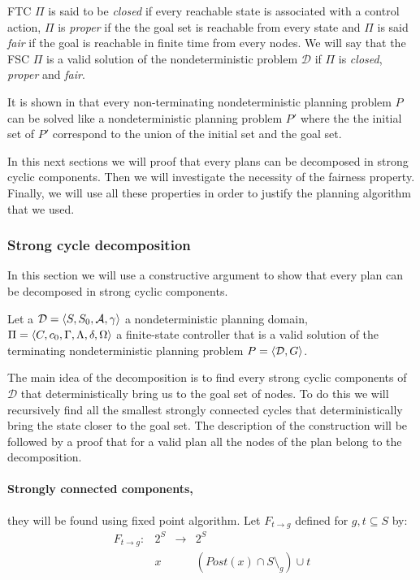 FTC $\Pi$ is said to be \textit{closed} if every reachable state is associated with a control  action, $\Pi$ is \textit{proper} if the the goal set is reachable from every state and $\Pi$ is said \textit{fair} if the goal is reachable in finite time from every nodes.
We will say that the FSC $\Pi$ is a valid solution of the nondeterministic problem $\mathcal{D}$ if $\Pi$ is \textit{closed}, \textit{proper} and \textit{fair}.

It is shown in \cite{patrizi2013fair} that every non-terminating nondeterministic planning problem $P$ can be solved like a nondeterministic planning problem $P'$ where the the initial set of $P'$ correspond to the union of the initial set and the goal set.

In this next sections we will proof that every plans can be decomposed in strong cyclic components.
Then we will investigate the necessity of the fairness property.
Finally, we will use all these properties in order to justify the planning algorithm that we used.

\subsubsection{Strong cycle decomposition}

In this section we will use a constructive argument to show that every plan can be decomposed in strong cyclic components.

Let a $\mathcal{D} = \planningdomain$ a nondeterministic planning domain, $\Pi = \controller$ a finite-state controller that is a valid solution of the terminating nondeterministic planning problem $P = \planningproblem$.

The main idea of the decomposition is to find every strong cyclic components of $\mathcal{D}$ that deterministically bring us to the goal set of nodes.
To do this we will recursively find all the smallest strongly connected cycles that deterministically bring the state closer to the goal set.
The description of the construction will be followed by a proof that for a valid plan  all the nodes of the plan belong to the decomposition.

\paragraph{Strongly connected components,} they will be found using fixed point algorithm.
Let $F_{t \rightarrow g}$ defined for $g,t \subseteq S$ by:
\begin{equation}
\begin{array}{llll}
F_{t \rightarrow g} :& 2^S & \rightarrow & 2^S\\
 & x &  & (Post(x) \cap S \setminus_g) \cup t
\end{array}
\end{equation}


